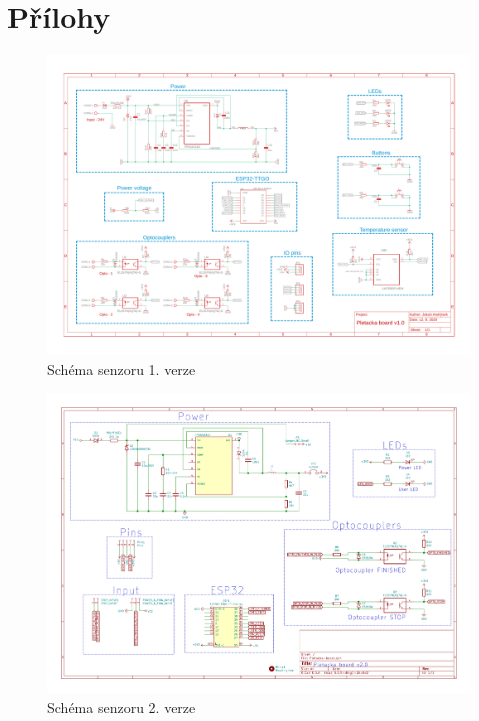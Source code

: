 \chapter*{Přílohy}


\begin{figure}[htbp]
    \centering
    \includegraphics[width=\textwidth]{DATASHEET/Pletacka_board_v1.pdf}
    \caption{Schéma senzoru 1. verze}
    \label{fig:Schemav1}
\end{figure}


\begin{figure}[htbp]
    \centering
    \includegraphics[width=\textwidth]{DATASHEET/Pletacka_board_v2.pdf}
    \caption{Schéma senzoru 2. verze}
    \label{fig:Schemav1}
\end{figure}

